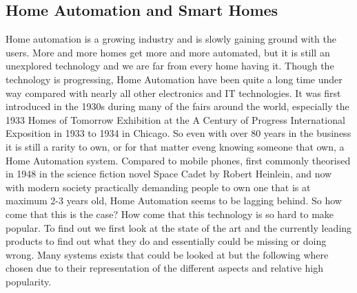 \subsection{Home Automation and Smart Homes}
Home automation is a growing industry and is slowly gaining ground with the users. More and more homes get more and more automated, but it is still an unexplored technology and we are far from every home having it. Though the technology is progressing, Home Automation have been quite a long time under way compared with nearly all other electronics and IT technologies. It was first introduced in the 1930s during many of the fairs around the world, especially the 1933 Homes of Tomorrow Exhibition at the A Century of Progress International Exposition in 1933 to 1934 in Chicago. So even with over 80 years in the business it is still a rarity to own, or for that matter eveng knowing someone that own, a Home Automation system. Compared to mobile phones, first commonly theorised in 1948 in the science fiction novel Space Cadet by Robert Heinlein, and now with modern society practically demanding people to own one that is at maximum 2-3 years old, Home Automation seems to be lagging behind. So how come that this is the case? How come that this technology is so hard to make popular. To find out we first look at the state of the art and the currently leading products to find out what they do and essentially could be missing or doing wrong. Many systems exists that could be looked at but the following where chosen due to their representation of the different aspects and relative high popularity.

